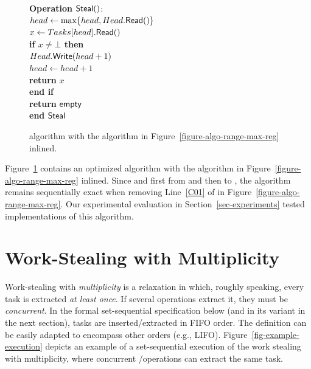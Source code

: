 \begin{figure}[!ht]
{{\begin{minipage}[t]{150mm}
\begin{tabbing}
          {\bf Operation} \({\sf \small Steal}()\): \\
           \> \> \(head \leftarrow \max\{head, Head.{\sf \small Read}()\}\)\\
           \> \> \(x \leftarrow Tasks[head].{\sf \small Read}()\) \\
           \> \> {\bf if \(x \neq \bot\) then}\\
           \> \> \> \(Head.{\sf \small Write}(head+1)\)\\
           \> \> \> \(head \leftarrow head+1\)\\
           \> \> \> {\bf return} \(x\)\\
           \> \> {\bf end if}\\
           \> \> {\bf return} ${\sf \small empty}$\\
          {\bf end} ${\sf \small Steal}$

        \end{tabbing}
      \end{minipage} }
    \caption{\label{figure-w-mult}\NCWSM algorithm with the \RangeMaxReg
      algorithm in Figure~\ref{figure-algo-range-max-reg} inlined.}
  }
\end{figure}


Figure~\ref{figure-w-mult} contains an optimized \NCWSM algorithm with the \RangeMaxReg algorithm in Figure~\ref{figure-algo-range-max-reg} inlined.  Since \Take and \Steal first \RMaxR from and then \RMaxW to , the algorithm remains sequentially exact when removing Line~\ref{C01} of \RMaxW in Figure~\ref{figure-algo-range-max-reg}.  Our experimental evaluation in Section~\ref{sec-experiments} tested implementations of this algorithm.



\section{\label{sec-ws-mult}Work-Stealing with Multiplicity}

Work-stealing with \emph{multiplicity} is a relaxation in which, roughly speaking, every task is extracted \emph{at least once}. If several operations extract it, they must be \emph{concurrent}.
In the formal set-sequential specification below (and in its variant in the next section), tasks are inserted/extracted in FIFO order. The definition can be easily adapted to encompass other orders (e.g., LIFO). Figure~\ref{fig-example-execution} depicts an example of a set-sequential execution of the work stealing with multiplicity, where concurrent \Take/\Steal operations can extract the same task.

